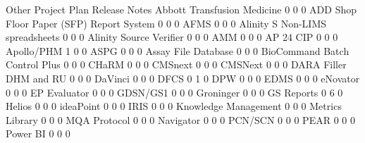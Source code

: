 \documentclass{article}
\begin{document}
\begin{Schunk}
\begin{Soutput}
                                           Other Project Plan Release Notes
  Abbott Transfusion Medicine                  0            0             0
  ADD Shop Floor Paper (SFP) Report System     0            0             0
  AFMS                                         0            0             0
  Alinity S Non-LIMS spreadsheets              0            0             0
  Alinity Source Verifier                      0            0             0
  AMM                                          0            0             0
  AP 24 CIP                                    0            0             0
  Apollo/PHM                                   1            0             0
  ASPG                                         0            0             0
  Assay File Database                          0            0             0
  BioCommand Batch Control Plus                0            0             0
  CHaRM                                        0            0             0
  CMSnext                                      0            0             0
  CMSNext                                      0            0             0
  DARA Filler DHM and RU                       0            0             0
  DaVinci                                      0            0             0
  DFCS                                         0            1             0
  DPW                                          0            0             0
  EDMS                                         0            0             0
  eNovator                                     0            0             0
  EP Evaluator                                 0            0             0
  GDSN/GS1                                     0            0             0
  Groninger                                    0            0             0
  GS Reports                                   0            6             0
  Helios                                       0            0             0
  ideaPoint                                    0            0             0
  IRIS                                         0            0             0
  Knowledge Management                         0            0             0
  Metrics Library                              0            0             0
  MQA Protocol                                 0            0             0
  Navigator                                    0            0             0
  PCN/SCN                                      0            0             0
  PEAR                                         0            0             0
  Power BI                                     0            0             0

\end{Soutput}
\end{Schunk}
\end{document}
